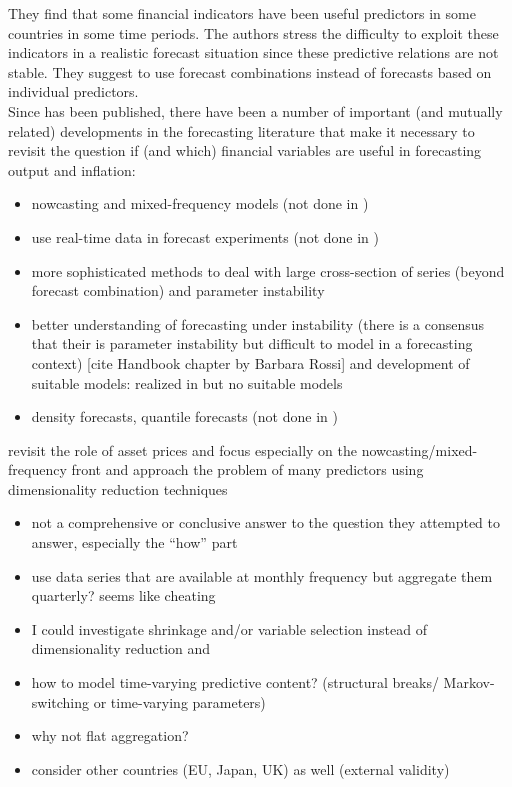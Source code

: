 \documentclass[12pt,a4paper]{scrartcl}
\begin{document}
They find that some financial indicators have been useful predictors in some countries in some time periods. The authors stress the difficulty to exploit these indicators in a realistic forecast situation since these predictive relations are not stable. They suggest to use forecast combinations instead of forecasts based on individual predictors.\\

Since \citet{StockWatson2003} has been published, there have been a number of important (and mutually related) developments in the forecasting literature that make it necessary to revisit the question if (and which) financial variables are useful in forecasting output and inflation:
\begin{itemize}
	\item nowcasting and mixed-frequency models (not done in \citet{StockWatson2003})
	\item use real-time data in forecast experiments (not done in \citet{StockWatson2003})
	\item more sophisticated methods to deal with large cross-section of series (beyond forecast combination) and parameter instability
	\item better understanding of forecasting under instability (there is a consensus that their is parameter instability but difficult to model in a forecasting context) [cite Handbook chapter by Barbara Rossi] and development of suitable models: realized in \citet{StockWatson2003} but no suitable models
	\item density forecasts, quantile forecasts (not done in \citet{StockWatson2003})
\end{itemize}



\citet{AndreouEtal2013} revisit the role of asset prices and focus especially on the nowcasting/mixed-frequency front and approach the problem of many predictors using dimensionality reduction techniques
\begin{itemize}
	\item not a comprehensive or conclusive answer to the question they attempted to answer, especially the ``how'' part
	\item use data series that are available at monthly frequency but aggregate them quarterly? seems like cheating
	\item I could investigate shrinkage and/or variable selection instead of dimensionality reduction and 
	\item how to model time-varying predictive content? (structural breaks/ Markov-switching or time-varying parameters)
	\item why not flat aggregation?
	\item consider other countries (EU, Japan, UK) as well (external validity)
\end{itemize}
\end{document}
